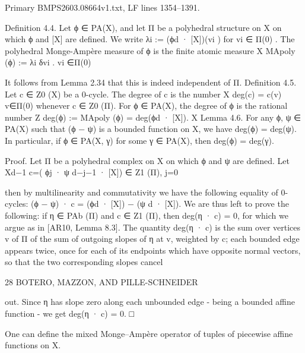 \documentclass[
  11pt,
]{article}
\newenvironment{Shaded}{}{}
\newcommand{\NormalTok}[1]{#1}
\begin{document}
Primary BMPS2603.08664v1.txt, LF lines 1354--1391.

\begin{Shaded}
\begin{Highlighting}[]
\NormalTok{Definition 4.4. Let ϕ ∈ PA(X), and let Π be a polyhedral structure on X on which ϕ and [X] are}
\NormalTok{defined. We write}
\NormalTok{                                      λi := (ϕd · [X])(vi )}
\NormalTok{for vi ∈ Π(0) . The polyhedral Monge{-}Ampère measure of ϕ is the finite atomic measure}
\NormalTok{                                                   X}
\NormalTok{                                   MApoly (ϕ) :=        λi δvi .}
\NormalTok{                                                    vi ∈Π(0)}

\NormalTok{   It follows from Lemma 2.34 that this is indeed independent of Π.}
\NormalTok{Definition 4.5. Let c ∈ Z0 (X) be a 0{-}cycle. The degree of c is the number}
\NormalTok{                                                X}
\NormalTok{                                      deg(c) =       c(v)}
\NormalTok{                                                   v∈Π(0)}
\NormalTok{whenever c ∈ Z0 (Π). For ϕ ∈ PA(X), the degree of ϕ is the rational number}
\NormalTok{                                      Z}
\NormalTok{                            deg(ϕ) :=   MApoly (ϕ) = deg(ϕd · [X]).}
\NormalTok{                                            X}
\NormalTok{Lemma 4.6. For any ϕ, ψ ∈ PA(X) such that (ϕ − ψ) is a bounded function on X, we have}
\NormalTok{deg(ϕ) = deg(ψ). In particular, if ϕ ∈ PA(X, γ) for some γ ∈ PA(X), then deg(ϕ) = deg(γ).}

\NormalTok{Proof. Let Π be a polyhedral complex on X on which ϕ and ψ are defined. Let}
\NormalTok{                                   Xd−1}
\NormalTok{                                c=(     ϕj · ψ d−j−1 · [X]) ∈ Z1 (Π),}
\NormalTok{                                      j=0}

\NormalTok{then by multilinearity and commutativity we have the following equality of 0{-}cycles:}
\NormalTok{                                (ϕ − ψ) · c = (ϕd · [X]) − (ψ d · [X]).}
\NormalTok{We are thus left to prove the following: if η ∈ PAb (Π) and c ∈ Z1 (Π), then deg(η · c) = 0, for which}
\NormalTok{we argue as in [AR10, Lemma 8.3]. The quantity deg(η · c) is the sum over vertices v of Π of the}
\NormalTok{sum of outgoing slopes of η at v, weighted by c; each bounded edge appears twice, once for each}
\NormalTok{of its endpoints which have opposite normal vectors, so that the two corresponding slopes cancel}

\NormalTok{28                                     BOTERO, MAZZON, AND PILLE{-}SCHNEIDER}


\NormalTok{out. Since η has slope zero along each unbounded edge {-} being a bounded affine function {-} we get}
\NormalTok{deg(η · c) = 0.                                                                               □}

\NormalTok{     One can define the mixed Monge–Ampère operator of tuples of piecewise affine functions on X.}
\end{Highlighting}
\end{Shaded}
\end{document}
